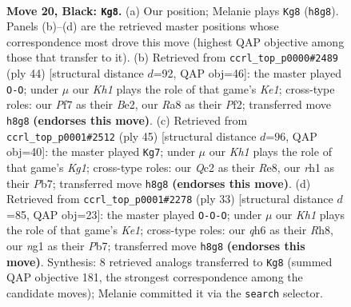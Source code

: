 \documentclass[11pt]{article}
\begin{document}
\clearpage

\begin{figure}[p]\centering
\begin{subfigure}{0.46\textwidth}\centering
\resizebox{\linewidth}{!}{%
\newchessgame
\chessboard[
  setfen={rnb1r2k/1p2np1p/4p2Q/p1P1P1P1/P4P2/8/2q1B3/R1B1K1NR b KQ - 0 20},
  showmover=false,
  pgfstyle=straightmove, color=movearrow, markmove={h8-g8}
]}
\caption{}
\end{subfigure}\hfill
\begin{subfigure}{0.46\textwidth}\centering
\resizebox{\linewidth}{!}{%
\newchessgame
\chessboard[
  setfen={1r1q1r1k/3b1p1p/3p2pb/1P1Qp3/RN2P2P/8/4BPP1/4K2R w K - 0 23},
  showmover=false,
  pgfstyle=straightmove, color=movearrow, markmove={e1-g1}
]}
\caption{}
\end{subfigure}
\\[4pt]
\begin{subfigure}{0.46\textwidth}\centering
\resizebox{\linewidth}{!}{%
\newchessgame
\chessboard[
  setfen={r3r1k1/1p1nBp2/1qbPp1pp/p7/2Q3P1/1PN4P/1P3P2/R3R1K1 b - - 1 23},
  showmover=false,
  pgfstyle=straightmove, color=movearrow, markmove={g8-g7}
]}
\caption{}
\end{subfigure}\hfill
\begin{subfigure}{0.46\textwidth}\centering
\resizebox{\linewidth}{!}{%
\newchessgame
\chessboard[
  setfen={r3k2r/pp3p2/4b2p/q1P3p1/3n4/P1RB2P1/1P3PP1/1Q2K1NR b Kkq - 0 17},
  showmover=false,
  pgfstyle=straightmove, color=movearrow, markmove={e8-c8}
]}
\caption{}
\end{subfigure}
\caption{\textbf{Move 20, Black: \texttt{Kg8}.} (a) Our position; Melanie plays \texttt{Kg8} (\texttt{h8g8}). Panels (b)--(d) are the retrieved master positions whose correspondence most drove this move (highest QAP objective among those that transfer to it). (b) Retrieved from \texttt{ccrl\_top\_p0000\#2489} (ply 44) [structural distance $d$=92, QAP obj=46]: the master played \texttt{O-O}; under $\mu$ our \emph{Kh1} plays the role of that game's \emph{Ke1}; cross-type roles: our \emph{P}f7 as their \emph{B}e2, our \emph{R}a8 as their \emph{P}f2; transferred move \texttt{h8g8} \textbf{(endorses this move)}. (c) Retrieved from \texttt{ccrl\_top\_p0001\#2512} (ply 45) [structural distance $d$=96, QAP obj=40]: the master played \texttt{Kg7}; under $\mu$ our \emph{Kh1} plays the role of that game's \emph{Kg1}; cross-type roles: our \emph{Q}c2 as their \emph{R}e8, our \emph{r}h1 as their \emph{P}b7; transferred move \texttt{h8g8} \textbf{(endorses this move)}. (d) Retrieved from \texttt{ccrl\_top\_p0001\#2278} (ply 33) [structural distance $d$=85, QAP obj=23]: the master played \texttt{O-O-O}; under $\mu$ our \emph{Kh1} plays the role of that game's \emph{Ke1}; cross-type roles: our \emph{q}h6 as their \emph{R}h8, our \emph{n}g1 as their \emph{P}b7; transferred move \texttt{h8g8} \textbf{(endorses this move)}. Synthesis: 8 retrieved analogs transferred to \texttt{Kg8} (summed QAP objective 181, the strongest correspondence among the candidate moves); Melanie committed it via the \texttt{search} selector.}
\label{fig:thought-m39}
\end{figure}
\end{document}
